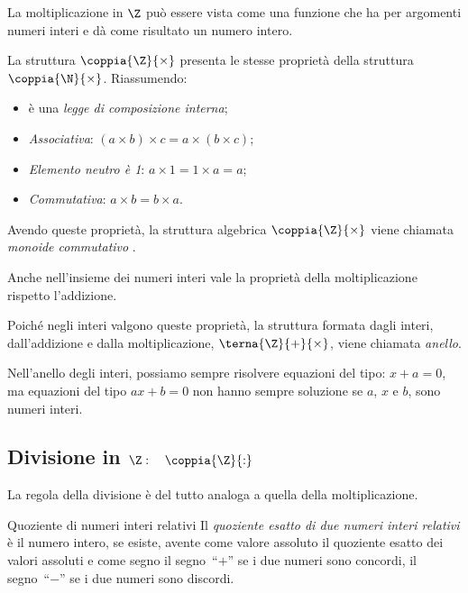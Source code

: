 La moltiplicazione in \(\Z\) può essere vista come una funzione che ha per 
argomenti numeri interi e dà come risultato un numero intero.

La struttura  
\(\coppia{\Z}{\times}\) presenta le stesse proprietà della struttura 
\(\coppia{\N}{\times}\).
Riassumendo:
\begin{itemize} [noitemsep]
 \item è una \emph{legge di composizione interna};
 \item \emph{Associativa}: \quad 
 \((a \times b) \times c = a \times (b \times c)\);
 \item \emph{Elemento neutro è 1}: \quad 
 \(a \times 1 = 1 \times a = a\);
 \item \emph{Commutativa}: \quad 
 \(a \times b = b \times a\).
\end{itemize}
Avendo queste proprietà, la struttura algebrica \(\coppia{\Z}{\times}\) viene 
chiamata \emph{monoide commutativo}
.

Anche nell'insieme dei numeri interi vale la proprietà 
 della
moltiplicazione rispetto l'addizione.

\bigskip
Poiché negli interi valgono queste proprietà, la struttura formata dagli 
interi, dall'addizione e dalla moltiplicazione, \(\terna{\Z}{+}{\times}\),
viene chiamata \emph{anello}.

Nell'anello degli interi, possiamo sempre risolvere equazioni del tipo:
\(x + a = 0\), ma equazioni del tipo \(ax + b = 0\) non hanno sempre 
soluzione se \(a\), \(x\) e \(b\), sono numeri interi.


\subsection{Divisione in 
\texorpdfstring{$\Z: \quad \coppia{\Z}{:}$}{Z: (Z; :)}}
\indc{\(\Z\)}{\(\coppia{\Z}{:}\)}

La regola della divisione è del tutto analoga a quella della 
moltiplicazione.

\begin{definizione}{Quoziente di numeri interi relativi}{}
Il \emph{quoziente esatto di due numeri interi relativi}
 è il numero intero, 
se esiste, avente come valore assoluto il quoziente esatto dei valori 
assoluti e come segno 
il segno~``\(+\)'' se i due numeri sono concordi,
il segno~``\(-\)'' se i due numeri sono discordi.
\end{definizione}

